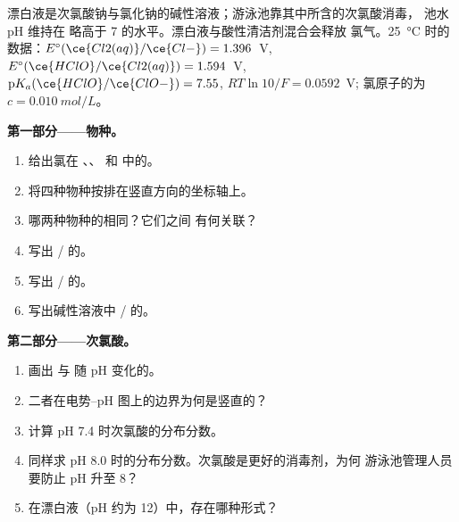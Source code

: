 \begin{problem}
\label{pb:b1:e-ph-diagrams:1}
漂白液是次氯酸钠与氯化钠的碱性溶液；游泳池靠其中所含的次氯酸消毒，
池水 pH 维持在
略高于 7 的水平。漂白液与酸性清洁剂混合会释放
氯气。\qty{25}{\celsius} 时的数据：$E^\circ(\ce{Cl2(aq)}/\ce{Cl-})
= 1.396$~V, $E^\circ(\ce{HClO}/\ce{Cl2(aq)}) = 1.594$~V,
$\mathrm{p}K_a(\ce{HClO}/\ce{ClO-}) = 7.55$, $RT\ln 10/F = 0.0592$~V;
氯原子的为 $c = \qty{0.010}{mol/L}$。

\medskip
\noindent\textbf{第一部分——物种。}
\begin{enumerate}
  \item 给出氯在 、、
         和  中的。
  \item 将四种物种按排在竖直方向的坐标轴上。
  \item 哪两种物种的相同？它们之间
        有何关联？
  \item 写出 / 的。
  \item 写出 / 的。
  \item 写出碱性溶液中 / 的。
\end{enumerate}

\medskip
\noindent\textbf{第二部分——次氯酸。}
\begin{enumerate}[resume]
  \item 画出  与  随
        pH 变化的。
  \item 二者在电势--pH 图上的边界为何是竖直的？
  \item 计算 pH 7.4 时次氯酸的分布分数。
  \item 同样求 pH 8.0 时的分布分数。次氯酸是更好的消毒剂，为何
        游泳池管理人员要防止 pH 升至 8？
  \item 在漂白液（pH 约为 12）中，存在哪种形式？
\end{enumerate}


\end{problem}
